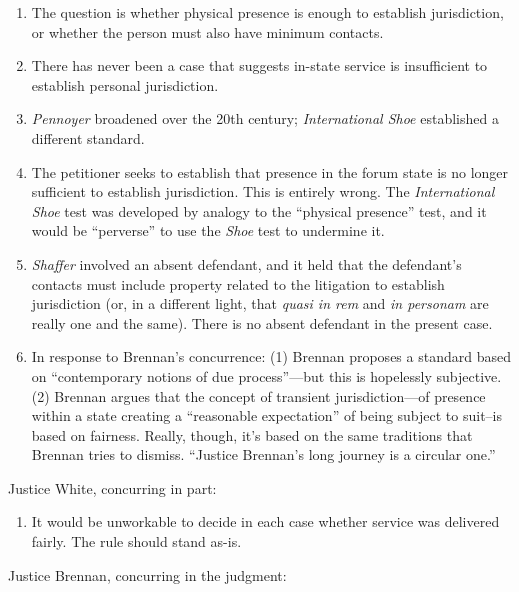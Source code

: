 \begin{enumerate}
\item
  The question is whether physical presence is enough to establish
  jurisdiction, or whether the person must also have minimum contacts.
\item
  There has never been a case that suggests in-state service is
  insufficient to establish personal jurisdiction.
\item
  \emph{Pennoyer} broadened over the 20th century; \emph{International
  Shoe} established a different standard.
\item
  The petitioner seeks to establish that presence in the forum state is
  no longer sufficient to establish jurisdiction. This is entirely
  wrong. The \emph{International Shoe} test was developed by analogy to
  the ``physical presence'' test, and it would be ``perverse'' to use
  the \emph{Shoe} test to undermine it.
\item
  \emph{Shaffer} involved an absent defendant, and it held that the
  defendant's contacts must include property related to the litigation
  to establish jurisdiction (or, in a different light, that \emph{quasi
  in rem} and \emph{in personam} are really one and the same). There is
  no absent defendant in the present case.
\item
  In response to Brennan's concurrence: (1) Brennan proposes a standard
  based on ``contemporary notions of due process''---but this is
  hopelessly subjective. (2) Brennan argues that the concept of
  transient jurisdiction---of presence within a state creating a
  ``reasonable expectation'' of being subject to suit--is based on
  fairness. Really, though, it's based on the same traditions that
  Brennan tries to dismiss. ``Justice Brennan's long journey is a
  circular one.''
\end{enumerate}

Justice White, concurring in part:

\begin{enumerate}
\item
  It would be unworkable to decide in each case whether service was
  delivered fairly. The rule should stand as-is.
\end{enumerate}

Justice Brennan, concurring in the judgment:

